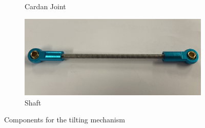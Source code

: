 \begin{figure}[ht]
\begin{subfigure}[b]{0.174\textwidth}
    \caption{Cardan Joint}
    \label{fig:const:int:cardan_joint}
  \end{subfigure}
  \hfill
  \begin{subfigure}[b]{0.80\textwidth}
    \includegraphics[width=\textwidth]{src/assets/pictures/construction/shaft.JPG}
    \caption{Shaft}
    \label{fig:const:int:shaft}
  \end{subfigure}
  \caption{Components for the tilting mechanism}
  \label{fig:const:int:tiltin_components}
\end{figure}
%
